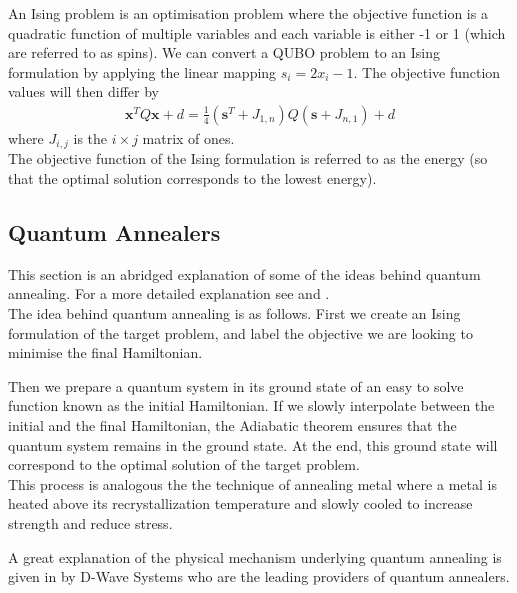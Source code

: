 \documentclass{article}
\begin{document}
\noindent An Ising problem is an optimisation problem where the objective function is a quadratic function of multiple variables and each variable is either -1 or 1 (which are referred to as spins). We can convert a QUBO problem to an Ising formulation by applying the linear mapping \(s_i = 2x_i - 1\). The objective function values will then differ by 
\begin{align*}
    \mathbf{x}^T Q \mathbf{x} + d = \frac{1}{4} (\mathbf{s}^T + J_{1,n})Q(\mathbf{s} + J_{n,1}) + d 
\end{align*} 
where \(J_{i,j}\) is the \(i \times j\) matrix of ones.\\

\noindent The objective function of the Ising formulation is referred to as the energy (so that the optimal solution corresponds to the lowest energy). 

\subsection{Quantum Annealers}

\noindent This section is an abridged explanation of some of the ideas behind quantum annealing. For a more detailed explanation see \cite{tasseff2022emergingpotentialquantumannealing} and \cite{Yarkoni_2022}.\\

\noindent The idea behind quantum annealing is as follows. First we create an Ising formulation of the target problem, and label the objective we are looking to minimise the final Hamiltonian.

\noindent Then we prepare a quantum system in its ground state of an easy to solve function known as the initial Hamiltonian. If we slowly interpolate between the initial and the final Hamiltonian, the Adiabatic theorem \cite{Yarkoni_2022} ensures that the quantum system remains in the ground state. At the end, this ground state will correspond to the optimal solution of the target problem.\\

\noindent This process is analogous the the technique of annealing metal where a metal is heated above its recrystallization temperature and slowly cooled to increase strength and reduce stress.

\noindent A great explanation of the physical mechanism underlying quantum annealing is given in \cite{quantumAnnealingDWave} by D-Wave Systems who are the leading providers of quantum annealers. \\
\end{document}

